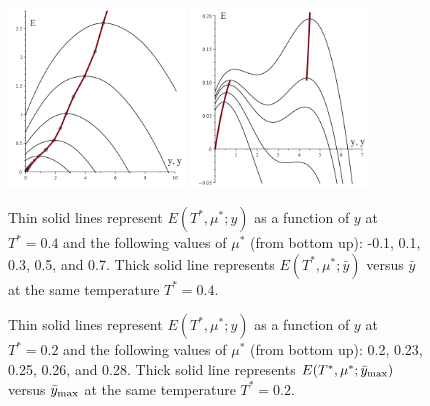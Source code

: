 \documentclass[12pt]{article}
\numberwithin{equation}{section}
\begin{document}
	\begin{figure}[htbp]
		\includegraphics[width=0.42\textwidth,angle=0]{images/EvsYvs_barY_a3}
		\hfill
		\includegraphics[width=0.42\textwidth,angle=0]{images/EvsYvs_barY_b2_1}
		\vfill
		\parbox{0.45\textwidth}{\caption{\label{fig:EvsYvs_barY_a1} Thin solid lines represent $E(T^*,\mu^*;y)$ as a function of $y$ at $T^*=0.4$ and the following values of $\mu^*$ (from bottom up): -0.1, 0.1, 0.3, 0.5, and 0.7. Thick solid line represents $E(T^*,\mu^*;\bar{y})$ versus $\bar{y}$ at the same temperature $T^* = 0.4$.}}
		\hfill
		\parbox{0.45\textwidth}{\caption{\label{fig:EvsYvs_barY_b1} Thin solid lines represent $E(T^*,\mu^*;y)$ as a function of $y$ at $T^*=0.2$ and the following values of $\mu^*$ (from bottom up): 0.2, 0.23, 0.25, 0.26, and 0.28. Thick solid line represents $E(T^*,\mu^*;\bar{y}_{\rm max})$ versus $\bar{y}_{\rm max}$ at the same temperature $T^* = 0.2$.}}
		
	\end{figure}
	
\end{document}
